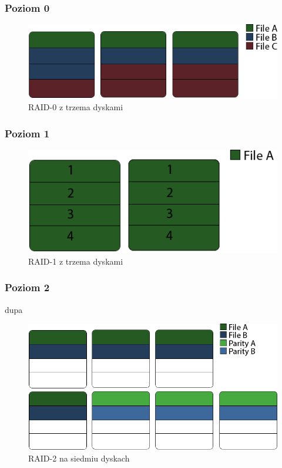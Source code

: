 \subsubsection{Poziom 0}
\begin{figure}[h!]
        \centering
        \includegraphics{raid-0.png}
        \caption{RAID-0 z trzema dyskami}
        \label{fig:raid0}
\end{figure}
\subsubsection{Poziom 1}
\begin{figure}[h!]
        \centering
        \includegraphics{raid-1.png}
        \caption{RAID-1 z trzema dyskami}
        \label{fig:raid1}
\end{figure}
\subsubsection{Poziom 2}
dupa
\begin{figure}[h!]
        \centering
        \includegraphics{raid-2.png}
        \caption{RAID-2 na siedmiu dyskach}
        \label{fig:raid2}
\end{figure}
